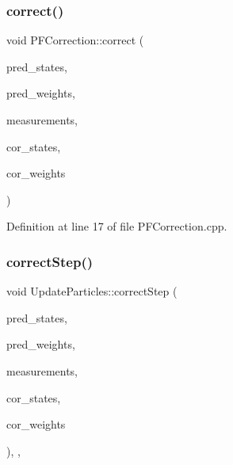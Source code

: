 \subsubsection{\texorpdfstring{correct()}{correct()}}
{\footnotesize\ttfamily void P\+F\+Correction\+::correct (\begin{DoxyParamCaption}\item[{const Eigen\+::\+Ref$<$ const Eigen\+::\+Matrix\+Xf $>$ \&}]{pred\+\_\+states,  }\item[{const Eigen\+::\+Ref$<$ const Eigen\+::\+Vector\+Xf $>$ \&}]{pred\+\_\+weights,  }\item[{const Eigen\+::\+Ref$<$ const Eigen\+::\+Matrix\+Xf $>$ \&}]{measurements,  }\item[{Eigen\+::\+Ref$<$ Eigen\+::\+Matrix\+Xf $>$}]{cor\+\_\+states,  }\item[{Eigen\+::\+Ref$<$ Eigen\+::\+Vector\+Xf $>$}]{cor\+\_\+weights }\end{DoxyParamCaption})\hspace{0.3cm}{\ttfamily [inherited]}}



Definition at line 17 of file P\+F\+Correction.\+cpp.

\mbox{\label{classbfl_1_1UpdateParticles_aa589f7fab7cd83f310c9dc17ee169dec}} 
\subsubsection{\texorpdfstring{correct\+Step()}{correctStep()}}
{\footnotesize\ttfamily void Update\+Particles\+::correct\+Step (\begin{DoxyParamCaption}\item[{const Eigen\+::\+Ref$<$ const Eigen\+::\+Matrix\+Xf $>$ \&}]{pred\+\_\+states,  }\item[{const Eigen\+::\+Ref$<$ const Eigen\+::\+Vector\+Xf $>$ \&}]{pred\+\_\+weights,  }\item[{const Eigen\+::\+Ref$<$ const Eigen\+::\+Matrix\+Xf $>$ \&}]{measurements,  }\item[{Eigen\+::\+Ref$<$ Eigen\+::\+Matrix\+Xf $>$}]{cor\+\_\+states,  }\item[{Eigen\+::\+Ref$<$ Eigen\+::\+Vector\+Xf $>$}]{cor\+\_\+weights }\end{DoxyParamCaption})\hspace{0.3cm}{\ttfamily [override]}, {\ttfamily [protected]}, {\ttfamily [virtual]}}



